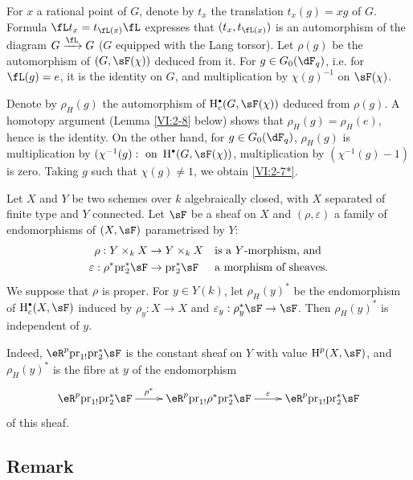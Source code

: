 For $x$ a rational point of $G$, denote by $t_x$ the translation $t_x(g) = x g$
of $G$. Formula $\fL t_x = t_{\fL(x)} \fL$ expresses that $(t_x,t_{\fL(x)})$
is an automorphism of the diagram $G\xrightarrow\fL G$ ($G$ equipped with the Lang
torsor). Let $\rho(g)$ be the automorphism of $(G,\sF(\chi))$ deduced from it.
For $g\in G_0(\dF_q)$, i.e. for $\fL(g) = e$, it is the identity on $G$, and
multiplication by $\chi(g)^{-1}$ on $\sF(\chi)$.

Denote by $\rho_H(g)$ the automorphism of $\h_c^\bullet(G,\sF(\chi))$ deduced from
$\rho(g)$. A homotopy argument (Lemma \ref{VI:2-8} below) shows that
$\rho_H(g) = \rho_H(e)$, hence is the identity. On the other hand, for
$g\in G_0(\dF_q)$, $\rho_H(g)$ is multiplication by
$(\chi^{-1}(g):\text{ on }\h^\bullet(G,\sF(\chi))$, multiplication by
$(\chi^{-1}(g)-1)$ is zero. Taking $g$ such that $\chi(g)\ne 1$, we obtain
\ref{VI:2-7*}. 





\begin{lemma_}\label{VI:2-8}
Let $X$ and $Y$ be two schemes over $k$ algebraically closed, with $X$
separated of finite type and $Y$ connected. Let $\sF$ be a sheaf on $X$ and
$(\rho,\varepsilon)$ a family of endomorphisms of $(X,\sF)$ parametrised
by $Y$:
\begin{align*}
  \rho:Y\times_k X &\to Y\times_k X && \text{is a $Y$-morphism, and} \\
  \varepsilon:\rho^\ast \pr_2^\ast \sF &\to \pr_2^\ast\sF && \text{a morphism of sheaves.}
\end{align*}
We suppose that $\rho$ is proper. For $y\in Y(k)$, let $\rho_H(y)^\ast$
be the endomorphism of $\h_c^\bullet(X,\sF)$ induced by $\rho_y:X\to X$ and
$\varepsilon_y:\rho_y^\ast\sF\to \sF$. Then $\rho_H(y)^\ast$ is
independent of $y$.
\end{lemma_}

Indeed, $\eR^p \pr_{1!} \pr_2^\ast\sF$ is the
constant sheaf on $Y$ with value $\h^p(X,\sF)$, and $\rho_H(y)^\ast$ is the
fibre at $y$ of the endomorphism 
\[\xymatrix{
  \eR^p \pr_{1!} \pr_2^\ast \sF \ar[r]^-{\rho^\ast} 
    & \eR^p \pr_{1!} \rho^\ast \pr_2^\ast \sF \ar[r]^-\varepsilon 
    & \eR^p \pr_{1!} \pr_2^\ast \sF 
}\]
of this sheaf.




\subsection{Remark}\label{VI:2-9}

